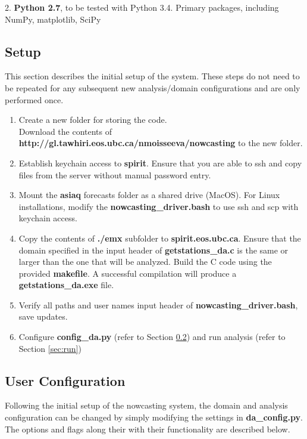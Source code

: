\documentclass{article}
\begin{document}
2. \textbf{Python 2.7}, to be tested with Python 3.4. Primary packages, including NumPy, matplotlib, SciPy

\subsection{Setup}

This section describes the initial setup of the system. These steps do not need to be repeated for any subsequent new analysis/domain configurations and are only performed once. 
\begin{enumerate}[1.]
\item Create a new folder for storing the code. \\ Download the contents of \textbf{http://gl.tawhiri.eos.ubc.ca/nmoisseeva/nowcasting} to the new folder.
\item Establish keychain access to \textbf{spirit}. Ensure that you are able to ssh and copy files from the server without manual password entry. 
\item Mount the \textbf{asiaq} forecasts folder as a shared drive (MacOS). For Linux installations, modify the \textbf{nowcasting\_driver.bash} to use ssh and scp with keychain access. 
\item Copy the contents of \textbf{./emx} subfolder to \textbf{spirit.eos.ubc.ca}. Ensure that the domain specified in the input header of \textbf{getstations\_da.c} is the same or larger than the one that will be analyzed. Build the C code using the provided \textbf{makefile}. A successful compilation will produce a \textbf{getstations\_da.exe} file. 
\item Verify all paths and user names input header of \textbf{nowcasting\_driver.bash}, save updates. 
\item Configure \textbf{config\_da.py} (refer to Section \ref{sec:config}) and run analysis (refer to Section \ref{sec:run})

\end{enumerate}

\subsection{User Configuration}\label{sec:config}

Following the initial setup of the nowcasting system, the domain and analysis configuration can be changed by simply modifying the settings in \textbf{da\_config.py}. The options and flags along their with their functionality are described below. \\
\end{document}

